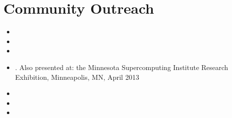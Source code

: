 \documentclass{report}
\begin{document}
\fi

\chapter{Community Outreach}


\begin{itemize} 
        \item {}
        \item {}
        \item {}     
        \item {}. Also presented at: the Minnesota Supercomputing Institute Research Exhibition, Minneapolis, MN, April 2013
        \item {}
        \item {}              
        \item {}
\end{itemize}



\ifstandalone


\end{document}
